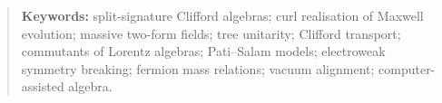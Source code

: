 \begin{abstract}
\medskip\noindent\textbf{Keywords:} split-signature Clifford algebras; curl realisation of Maxwell evolution; massive two-form fields; tree
unitarity; Clifford transport; commutants of Lorentz algebras; Pati--Salam models; electroweak symmetry breaking; fermion mass relations;
vacuum alignment; computer-assisted algebra.
\end{abstract}

\tableofcontents












\appendix





